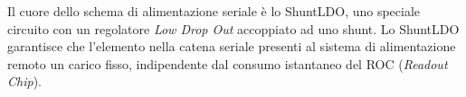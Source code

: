 

Il cuore dello schema di alimentazione seriale \`e lo ShuntLDO, uno speciale circuito con un regolatore \textit{Low Drop Out} accoppiato ad uno shunt. Lo ShuntLDO garantisce che l'elemento nella catena seriale presenti al sistema di alimentazione remoto un carico fisso, indipendente dal consumo istantaneo del ROC (\textit{Readout Chip}).



